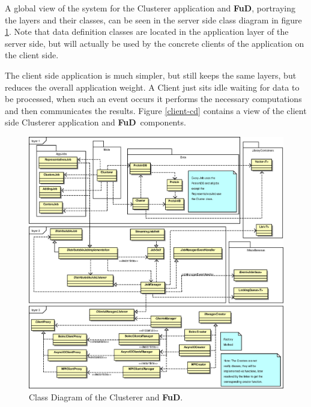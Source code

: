 \documentclass[a4paper,12pt,english]{report}
\newcommand{\fud}{\textbf{FuD}}
\begin{document}
A global view of the system for the Clusterer application and \fud, portraying the layers and their classes, can be seen in the server side class diagram in figure \ref{server-cd}. Note that data definition classes are located in the application layer of the server side, but will actually be used by the concrete clients of the application on the client side. 

The client side application is much simpler, but still keeps the same layers, but reduces the overall application weight. A Client just sits idle waiting for data to be processed, when such an event occurs it performs the necessary computations and then communicates the results. Figure \ref{client-cd} contains a view of the client side Clusterer application and \fud \ components.

\begin{figure}[!ht]
\begin{center}
\includegraphics [width=13.2cm]{images/server-cd.eps}
\end{center}
\caption{Class Diagram of the Clusterer and \fud.}
\label{server-cd}
\end{figure}
\end{document}
